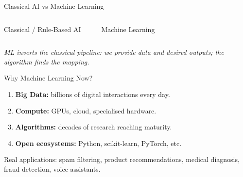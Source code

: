 \documentclass[10pt]{beamer}
\begin{document}
\begin{frame}{Classical AI vs Machine Learning}
    \begin{columns}[T,onlytextwidth]
        \alert{Classical / Rule-Based AI}
        \vspace{0.2cm}

        \begin{center}
        \end{center}

        \alert{Machine Learning}
        \vspace{0.2cm}

        \begin{center}
        \end{center}
    \end{columns}
    \vspace{0.3cm}
    \textit{ML inverts the classical pipeline: we provide data and desired outputs; the algorithm finds the mapping.}
\end{frame}

\begin{frame}{Why Machine Learning Now?}
    \begin{enumerate}
        \item \textbf{Big Data:} billions of digital interactions every day.
        \item \textbf{Compute:} GPUs, cloud, specialised hardware.
        \item \textbf{Algorithms:} decades of research reaching maturity.
        \item \textbf{Open ecosystems:} Python, scikit-learn, PyTorch, etc.
    \end{enumerate}
    \vspace{0.3cm}
    Real applications: spam filtering, product recommendations, medical diagnosis, fraud detection, voice assistants.
\end{frame}
\end{document}

